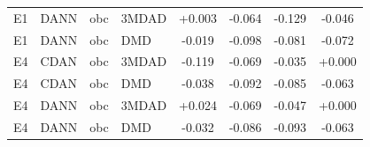 \begin{table}[t]
\begin{tabular}{llllcccc}
E1 & DANN & obc & 3MDAD & +0.003 & -0.064 & -0.129 & -0.046 \\
E1 & DANN & obc & DMD & -0.019 & -0.098 & -0.081 & -0.072 \\
\midrule
E4 & CDAN & obc & 3MDAD & -0.119 & -0.069 & -0.035 & +0.000 \\
E4 & CDAN & obc & DMD & -0.038 & -0.092 & -0.085 & -0.063 \\
E4 & DANN & obc & 3MDAD & +0.024 & -0.069 & -0.047 & +0.000 \\
E4 & DANN & obc & DMD & -0.032 & -0.086 & -0.093 & -0.063 \\
\bottomrule
\end{tabular}
\end{table}

